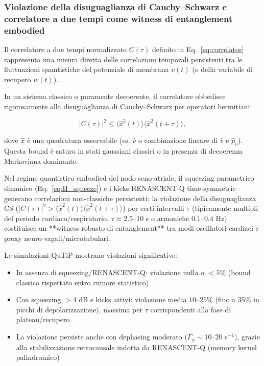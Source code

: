 \documentclass[11pt,a4paper]{article}
\theoremstyle{plain}
\theoremstyle{definition}
\begin{document}
\vspace{0.4cm}

\subsubsection{Violazione della disuguaglianza di Cauchy--Schwarz e correlatore a due tempi come witness di entanglement embodied}
\label{subsubsec:cs-violation-correlator}

Il correlatore a due tempi normalizzato $C(\tau)$ definito in Eq.~\eqref{eq:correlator} rappresenta una misura diretta delle correlazioni temporali persistenti tra le fluttuazioni quantistiche del potenziale di membrana $v(t)$ (o della variabile di recupero $w(t)$). 

\vspace{0.3cm}


In un sistema classico o puramente decoerente, il correlatore obbedisce rigorosamente alla disuguaglianza di Cauchy--Schwarz per operatori hermitiani:

\begin{equation}
|C(\tau)|^2 \leq \langle \hat{x}^2(t) \rangle \langle \hat{x}^2(t+\tau) \rangle,
\label{eq:CS_witness}
\end{equation}

\vspace{0.3cm}

dove $\hat{x}$ è una quadratura osservabile (es. $\hat{v}$ o combinazione lineare di $\hat{v}$ e $\hat{p}_v$). Questa bound è saturo in stati gaussiani classici o in presenza di decoerenza Markoviana dominante.


\vspace{0.4cm}

Nel regime quantistico embodied del nodo seno-atriale, il squeezing parametrico dinamico (Eq.~\eqref{eq:H_squeeze}) e i kicks RENASCENT-Q time-symmetric generano correlazioni non-classiche persistenti: la violazione della disuguaglianza CS ($|C(\tau)|^2 > \langle \hat{x}^2(t) \rangle \langle \hat{x}^2(t+\tau) \rangle$) per certi intervalli $\tau$ (tipicamente multipli del periodo cardiaco/respiratorio, $\tau \approx 2.5$--$10$ s o armoniche $0.1$--$0.4$ Hz) costituisce un **witness robusto di entanglement** tra modi oscillatori cardiaci e proxy neuro-vagali/microtubulari.


\vspace{0.4cm}

Le simulazioni QuTiP mostrano violazioni significative:

\begin{itemize}
    \item In assenza di squeezing/RENASCENT-Q: violazione nulla o $<5\%$ (bound classico rispettato entro rumore statistico)
    \item Con squeezing $>4$ dB e kicks attivi: violazione media $10$--$25\%$ (fino a $35\%$ in picchi di depolarizzazione), massima per $\tau$ corrispondenti alla fase di plateau/recupero
    \item La violazione persiste anche con dephasing moderato ($\Gamma_\phi \sim 10$--$20$ s$^{-1}$), grazie alla stabilizzazione retrocausale indotta da RENASCENT-Q (memory kernel palindromico)
\end{itemize}
\end{document}
